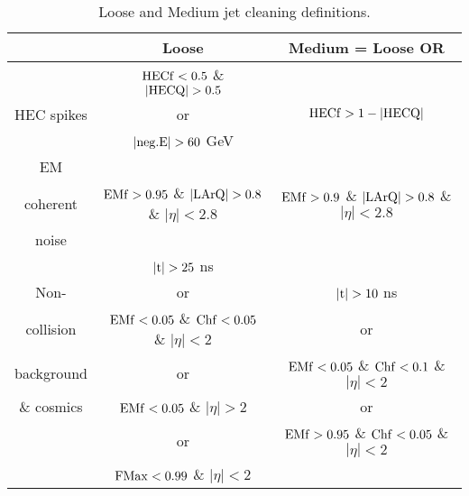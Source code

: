 \begin{table}
\begin{center}
\footnotesize

\begin{tabular}{|c||c|c|}
\hline
& Loose & Medium = Loose OR \\
\hline
            & $\rm HECf<0.5$ \& $|\rm HECQ|>0.5$                         &                                                              \\
HEC spikes  &              or                                              & $\rm HECf>1-|HECQ|$                                          \\
            &  $\rm |neg.E|>60$ GeV                                        &                                                              \\
\hline
EM          &                                                              &                                                              \\
coherent    & $\rm EMf >0.95$ \& $\rm |LArQ| >0.8$ \& $|\eta|<2.8$     &   $\rm EMf >0.9$ \& $\rm |LArQ| >0.8$ \& $|\eta|<2.8$    \\
noise       &                                                              &                                                              \\
\hline
            &           $\rm |t|>25$ ns                                                    &                                                              \\
Non-        &              or                                              &  $\rm |t|>10$ ns                                          \\
collision   & $\rm EMf <0.05$ \& $\rm Chf<0.05$ \& $|\eta|<2$     &   or     \\
background  &        or                     &   $\rm EMf<0.05$ \& $\rm Chf <0.1$ \& $|\eta|<2$    \\
\& cosmics  & $\rm EMf <0.05$ \&  $|\eta|>2$     &   or     \\
            &        or                     &   $\rm EMf>0.95$ \& $\rm Chf <0.05$ \& $|\eta|<2$    \\
             & $\rm FMax<0.99$ \&  $|\eta|<2$     &        \\

\hline

\end{tabular}
\caption[Jet Cleaning Definitions]{
Loose and Medium jet cleaning definitions.
\label{det:Cleaning}
}
\end{center}
\end{table}



